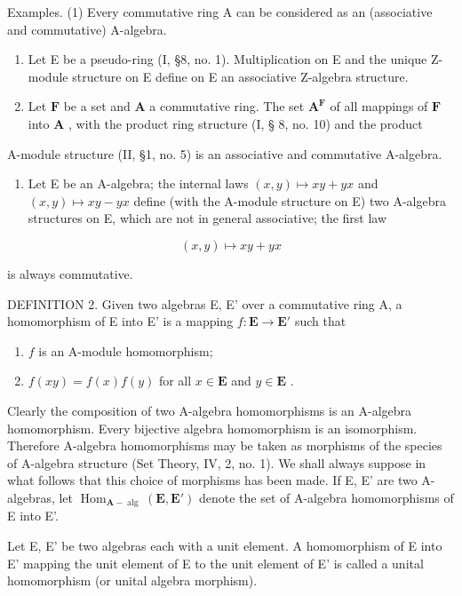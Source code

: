 Examples. (1) Every commutative ring A can be considered as an (associative and commutative) A-algebra.

\begin{enumerate}
\def\labelenumi{(\arabic{enumi})}
\setcounter{enumi}{1}
\item
  Let E be a pseudo-ring (I, §8, no. 1). Multiplication on E and the unique Z-module structure on E define on E an associative Z-algebra structure.
\item
  Let \(\mathbf{F}\) be a set and \(\mathbf{A}\) a commutative ring. The set \(\mathbf{A}^{\mathbf{F}}\) of all mappings of \(\mathbf{F}\) into \(\mathbf{A}\) , with the product ring structure (I, § 8, no. 10) and the product
\end{enumerate}

A-module structure (II, §1, no. 5) is an associative and commutative A-algebra.

\begin{enumerate}
\def\labelenumi{(\arabic{enumi})}
\setcounter{enumi}{3}
\tightlist
\item
  Let E be an A-algebra; the internal laws \((x,y)\mapsto xy+yx\) and \((x,y)\mapsto xy-yx\) define (with the A-module structure on E) two A-algebra structures on E, which are not in general associative; the first law
\end{enumerate}

\[
(x, y) \mapsto x y + y x
\]

is always commutative.

DEFINITION 2. Given two algebras E, E' over a commutative ring A, a homomorphism of E into E' is a mapping \(f: \mathbf{E} \to \mathbf{E}'\) such that

\begin{enumerate}
\def\labelenumi{(\arabic{enumi})}
\item
  \(f\) is an A-module homomorphism;
\item
  \(f(xy) = f(x)f(y)\) for all \(x \in \mathbf{E}\) and \(y \in \mathbf{E}\) .
\end{enumerate}

Clearly the composition of two A-algebra homomorphisms is an A-algebra homomorphism. Every bijective algebra homomorphism is an isomorphism. Therefore A-algebra homomorphisms may be taken as morphisms of the species of A-algebra structure (Set Theory, IV, 2, no. 1). We shall always suppose in what follows that this choice of morphisms has been made. If E, E' are two A-algebras, let \(\operatorname{Hom}_{\mathbf{A}-\operatorname{alg}}(\mathbf{E}, \mathbf{E}')\) denote the set of A-algebra homomorphisms of E into E'.

Let E, E' be two algebras each with a unit element. A homomorphism of E into E' mapping the unit element of E to the unit element of E' is called a unital homomorphism (or unital algebra morphism).

